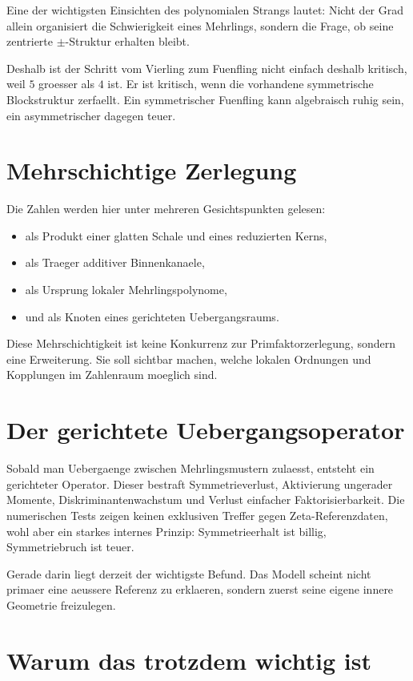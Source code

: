 \documentclass[11pt,a4paper]{article}
\begin{document}
Eine der wichtigsten Einsichten des polynomialen Strangs lautet: Nicht der Grad allein organisiert die Schwierigkeit eines Mehrlings, sondern die Frage, ob seine zentrierte \(\pm\)-Struktur erhalten bleibt.

Deshalb ist der Schritt vom Vierling zum Fuenfling nicht einfach deshalb kritisch, weil \(5\) groesser als \(4\) ist. Er ist kritisch, wenn die vorhandene symmetrische Blockstruktur zerfaellt. Ein symmetrischer Fuenfling kann algebraisch ruhig sein, ein asymmetrischer dagegen teuer.

\section{Mehrschichtige Zerlegung}

Die Zahlen werden hier unter mehreren Gesichtspunkten gelesen:
\begin{itemize}[leftmargin=2em]
\item als Produkt einer glatten Schale und eines reduzierten Kerns,
\item als Traeger additiver Binnenkanaele,
\item als Ursprung lokaler Mehrlingspolynome,
\item und als Knoten eines gerichteten Uebergangsraums.
\end{itemize}

Diese Mehrschichtigkeit ist keine Konkurrenz zur Primfaktorzerlegung, sondern eine Erweiterung. Sie soll sichtbar machen, welche lokalen Ordnungen und Kopplungen im Zahlenraum moeglich sind.

\section{Der gerichtete Uebergangsoperator}

Sobald man Uebergaenge zwischen Mehrlingsmustern zulaesst, entsteht ein gerichteter Operator. Dieser bestraft Symmetrieverlust, Aktivierung ungerader Momente, Diskriminantenwachstum und Verlust einfacher Faktorisierbarkeit. Die numerischen Tests zeigen keinen exklusiven Treffer gegen Zeta-Referenzdaten, wohl aber ein starkes internes Prinzip: Symmetrieerhalt ist billig, Symmetriebruch ist teuer.

Gerade darin liegt derzeit der wichtigste Befund. Das Modell scheint nicht primaer eine aeussere Referenz zu erklaeren, sondern zuerst seine eigene innere Geometrie freizulegen.

\section{Warum das trotzdem wichtig ist}
\end{document}
